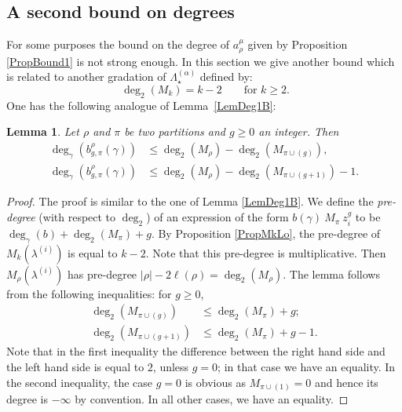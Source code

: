 \documentclass[11pt]{amsart}
\theoremstyle{plain}
\newtheorem{lemma}{Lemma}[section]
\theoremstyle{remark}
\newcommand{\Pola}{\Lambda_\star^{(\alpha)}}
\newcommand{\lo}{\lambda^{(i)}}
\begin{document}
\subsection{A second bound on degrees}\label{SubsectBound2}
For some purposes the bound on the degree of $a_\rho^\mu$ given by Proposition \ref{PropBound1} is not strong enough.
In this section we give another bound which is related to another gradation of $\Pola$
defined by:
\[ \ \deg_2(M_k)=k-2 \qquad \text{for } k\geq 2 .\]
One has the following analogue of Lemma~\ref{LemDeg1B}:
\begin{lemma}
    Let $\rho$ and $\pi$ be two partitions and $g\geq 0$ an integer.
    Then
    \begin{align*}
            \deg_\gamma(b_{g,\pi}^\rho(\gamma)) &\leq \deg_2(M_\rho) - \deg_2(M_{\pi \cup (g)}), \\
            \deg_\gamma(b_{g,\pi}^\rho(\gamma)) &\leq \deg_2(M_\rho) - \deg_2(M_{\pi \cup (g+1)}) - 1. 
    \end{align*}
    \label{LemDeg2B}
\end{lemma}
\begin{proof}
    The proof is similar to the one of Lemma \ref{LemDeg1B}.
    We define the {\em pre-degree} (with respect to $\deg_2$)
    of an expression of the form $b(\gamma)\ M_\pi\ z_i^g$
    to be $\deg_\gamma(b)+\deg_2(M_\pi)+g$.
    By Proposition \ref{PropMkLo}, the pre-degree of $M_k(\lo)$ is equal to $k-2$.
    Note that this pre-degree is multiplicative. Then
    $M_\rho(\lo)$ has pre-degree $|\rho|-2 \ell(\rho)=\deg_2(M_\rho)$.
    The lemma follows from the following inequalities: for $g\geq 0$,
    \begin{align*}
        \deg_2(M_{\pi \cup (g)}) &\leq \deg_2(M_{\pi})+g; \\
        \deg_2(M_{\pi \cup (g+1)}) &\leq \deg_2(M_{\pi})+g-1.
    \end{align*}
    Note that in the first inequality the difference between the right hand side and the left hand side is equal to $2$, unless $g=0$;
    in that case we have an equality.
    In the second inequality, the case $g=0$ is obvious as $M_{\pi \cup (1)}=0$
    and hence its degree is $-\infty$ by convention.
    In all other cases, we have an equality.
\end{proof}
\end{document}
